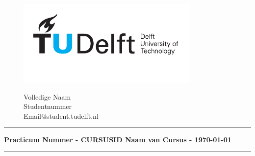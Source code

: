 \documentclass[a4paper, answers, addpoints]{exam}
\begin{document}
\begin{figure}[ht!]
    \begin{minipage}[H]{0.33\textwidth}
		\vspace{0.3cm}
		\includegraphics[scale=0.8]{TUDelftLogo.pdf}
	\end{minipage}
	\begin{minipage}[H]{0.33\textwidth}
    \hfill
	\end{minipage}
	\begin{minipage}[H]{0.33\textwidth}
		\begin{center}
		\large{Volledige Naam}\\
		\normalsize
			Studentnummer\\
			Email@student.tudelft.nl
		\end{center}
	\end{minipage}
\end{figure}
\vspace{-0.5cm}
\hrule
\begin{center}
	\textbf{Practicum Nummer - CURSUSID Naam van Cursus  - \today}\\
\end{center}
\hrule
\vspace{0.3cm}
    
\end{document}
